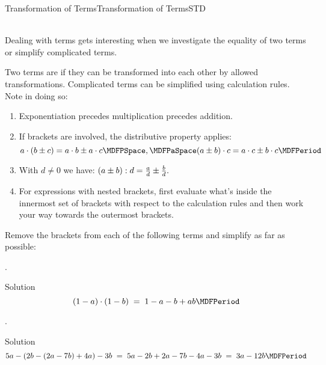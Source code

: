 \begin{MXContent}{Transformation of Terms}{Transformation of Terms}{STD}

\ \\
Dealing with terms gets interesting when we investigate the equality of two terms or simplify complicated terms.

\begin{MInfo}
Two terms are  if they can be transformed into each other by allowed transformations. 
Complicated terms can be simplified using calculation rules. Note in doing so:
\begin{enumerate}
\item Exponentiation precedes multiplication precedes addition.
\item If brackets are involved, the distributive property applies:
$$a\cdot(b\pm c) = a\cdot b\pm a\cdot c \MDFPSpace, \MDFPaSpace (a\pm b)\cdot c = a\cdot c \pm b\cdot c \MDFPeriod$$
\item With $d\neq 0$ we have: $\displaystyle (a\pm b):d = \tfrac{a}{d}\pm \tfrac{b}{d}.$
\item For expressions with nested brackets, first evaluate what's inside the innermost
  set of brackets with respect to the calculation rules and then work your way towards the outermost brackets.
\end{enumerate}
\end{MInfo}

\begin{MExercise}
Remove the brackets from each of the following terms and simplify as far as possible:
\begin{MExerciseItems}
\item{. \begin{MHint}{Solution}$$(1-a)\cdot(1-b)\;=\; 1-a-b+a b \MDFPeriod $$\end{MHint}}
\item{. \begin{MHint}{Solution}$$5a-(2b-(2a-7b)+4a)-3b \; = \; 5a-2b+2a-7b-4a-3b \;=\; 3a-12b \MDFPeriod  $$\end{MHint}}
\end{MExerciseItems}
\end{MExercise}


\end{MXContent}

